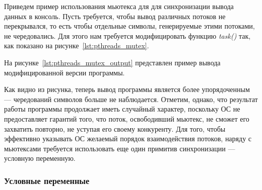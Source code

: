 Приведем пример использования мьютекса для для синхронизации вывода данных в консоль.
Пусть требуется, чтобы вывод различных потоков не перекрывался,
то есть чтобы отдельные символы, генерируемые этими потоками, не чередовались.
Для этого нам требуется модифицировать функцию \textit{task()} так, как показано на
рисунке~\ref{lst:pthreads_mutex}.



На рисунке~\ref{lst:pthreads_mutex_output} представлен пример вывода
модифицированной версии программы.



Как видно из рисунка, теперь вывод программы является более упорядоченным ---
чередований символов больше не наблюдается.
Отметим, однако, что результат работы программы продолжает иметь случайный характер,
поскольку ОС не предоставляет гарантий того, что поток, освободивший мьютекс,
не сможет его захватить повторно, не уступая его своему конкуренту.
Для того, чтобы эффективно указывать ОС желаемый порядок взаимодействия потоков,
наряду с мьютексами требуется использовать еще один примитив синхронизации ---
условную переменную.

\subsubsection{Условные переменные}

